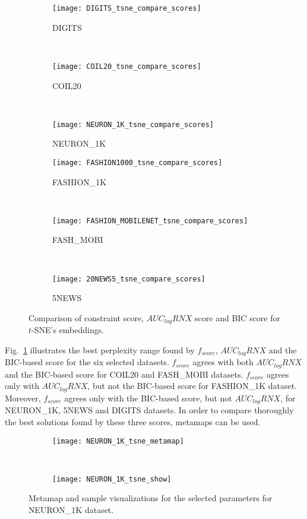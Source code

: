 \begin{figure}
    \centering
    \begin{subfigure}[b]{0.3\linewidth}
        \centering
        \texttt{[image: DIGITS\_tsne\_compare\_scores]}
        \caption{DIGITS}
    \end{subfigure}
    ~
    \begin{subfigure}[b]{0.3\linewidth}
        \texttt{[image: COIL20\_tsne\_compare\_scores]}
        \caption{COIL20}
    \end{subfigure}
    ~
    \begin{subfigure}[b]{0.3\linewidth}
        \texttt{[image: NEURON\_1K\_tsne\_compare\_scores]}
        \caption{NEURON\_1K}
    \end{subfigure}
    \vfill
    \begin{subfigure}[b]{0.3\linewidth}
        \centering
        \texttt{[image: FASHION1000\_tsne\_compare\_scores]}
        \caption{FASHION\_1K}
    \end{subfigure}
    ~
    \begin{subfigure}[b]{0.3\linewidth}
        \texttt{[image: FASHION\_MOBILENET\_tsne\_compare\_scores]}
        \caption{FASH\_MOBI}
    \end{subfigure}
    ~
    \begin{subfigure}[b]{0.3\linewidth}
        \texttt{[image: 20NEWS5\_tsne\_compare\_scores]}
        \caption{5NEWS}
    \end{subfigure}
    \caption{Comparison of constraint score, $AUC_{log}RNX$ score and BIC score for $t$-SNE's embeddings.}
    \label{fig:tsne:compare}
\end{figure}

Fig.~\ref{fig:tsne:compare} illustrates the best perplexity range found by $f_{score}$, $AUC_{log}RNX$ and the BIC-based score for the six selected datasets.
$f_{score}$ agrees with both $AUC_{log}RNX$ and the BIC-based score for COIL20 and {FASH\_MOBI} datasets.
$f_{score}$ agrees only with $AUC_{log}RNX$, but not the BIC-based score for {FASHION\_1K} dataset.
Moreover, $f_{score}$ agrees only with the BIC-based score, but not $AUC_{log}RNX$, for {NEURON\_1K}, 5NEWS and DIGITS datasets.
In order to compare thoroughly the best solutions found by these three scores, metamaps can be used.

\begin{figure*}[ht!]
    \centering
    \begin{subfigure}[b]{.8\linewidth}
        \texttt{[image: NEURON\_1K\_tsne\_metamap]}
    \end{subfigure}
    ~
    \begin{subfigure}[b]{.8\linewidth}
        \texttt{[image: NEURON\_1K\_tsne\_show]}
    \end{subfigure}
    \caption{Metamap and sample visualizations for the selected parameters for {NEURON\_1K} dataset.}
    \label{fig:tsne:meta:NEURON1K}
\end{figure*}

